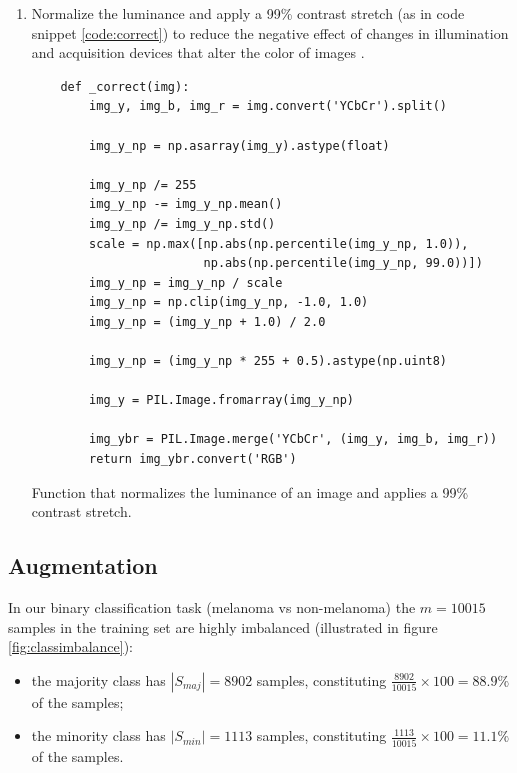 \begin{enumerate}
\item Normalize the luminance and apply a 99\% contrast stretch (as in code snippet \ref{code:correct}) to reduce the negative effect of changes in illumination and acquisition devices that alter the color of images \cite{colorconstancy}.

    \begin{listing}[ht]
    \begin{verbatim}
    def _correct(img):
        img_y, img_b, img_r = img.convert('YCbCr').split()

        img_y_np = np.asarray(img_y).astype(float)

        img_y_np /= 255
        img_y_np -= img_y_np.mean()
        img_y_np /= img_y_np.std()
        scale = np.max([np.abs(np.percentile(img_y_np, 1.0)),
                        np.abs(np.percentile(img_y_np, 99.0))])
        img_y_np = img_y_np / scale
        img_y_np = np.clip(img_y_np, -1.0, 1.0)
        img_y_np = (img_y_np + 1.0) / 2.0

        img_y_np = (img_y_np * 255 + 0.5).astype(np.uint8)

        img_y = PIL.Image.fromarray(img_y_np)

        img_ybr = PIL.Image.merge('YCbCr', (img_y, img_b, img_r))
        return img_ybr.convert('RGB')
    \end{verbatim}
    \caption{Function that normalizes the luminance of an image and applies a 99\% contrast stretch.}
    \label{code:correct}
    \end{listing}
\end{enumerate}

\subsection{Augmentation}
\label{subsection:augmentation}

In our binary classification task (melanoma vs non-melanoma) the $m = 10015$ samples in the training set are highly imbalanced (illustrated in figure \ref{fig:classimbalance}):

\begin{itemize}
    \item the majority class has $|S_{maj}| = 8902$ samples, constituting $\frac{8902}{10015} \times 100 = 88.9\%$ of the samples;
    \item the minority class has $|S_{min}| = 1113$ samples, constituting $\frac{1113}{10015} \times 100 = 11.1\%$ of the samples.
\end{itemize}


